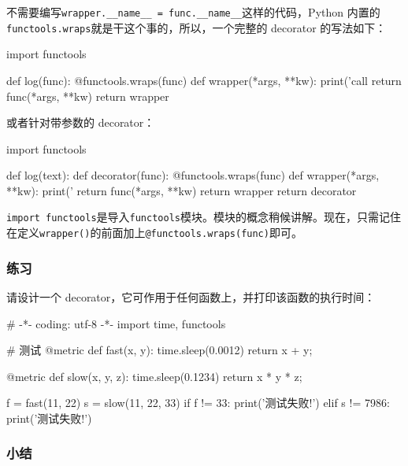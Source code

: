 不需要编写\texttt{wrapper.\_\_name\_\_\ =\ func.\_\_name\_\_}这样的代码，Python
内置的\texttt{functools.wraps}就是干这个事的，所以，一个完整的 decorator
的写法如下：

\begin{pythoncode}
import functools

def log(func):
    @functools.wraps(func)
    def wrapper(*args, **kw):
        print('call %
        return func(*args, **kw)
    return wrapper
\end{pythoncode}

或者针对带参数的 decorator：

\begin{pythoncode}
import functools

def log(text):
    def decorator(func):
        @functools.wraps(func)
        def wrapper(*args, **kw):
            print('%
            return func(*args, **kw)
        return wrapper
    return decorator
\end{pythoncode}

\texttt{import\ functools}是导入\texttt{functools}模块。模块的概念稍候讲解。现在，只需记住在定义\texttt{wrapper()}的前面加上\texttt{@functools.wraps(func)}即可。

\hypertarget{ux7ec3ux4e60}{%
\subsubsection{练习}\label{ux7ec3ux4e60}}

请设计一个 decorator，它可作用于任何函数上，并打印该函数的执行时间：

\begin{pythoncode}
# -*- coding: utf-8 -*-
import time, functools
\end{pythoncode}

\begin{pythoncode}
# 测试
@metric
def fast(x, y):
    time.sleep(0.0012)
    return x + y;

@metric
def slow(x, y, z):
    time.sleep(0.1234)
    return x * y * z;

f = fast(11, 22)
s = slow(11, 22, 33)
if f != 33:
    print('测试失败!')
elif s != 7986:
    print('测试失败!')
\end{pythoncode}

\hypertarget{ux5c0fux7ed3}{%
\subsubsection{小结}\label{ux5c0fux7ed3}}

